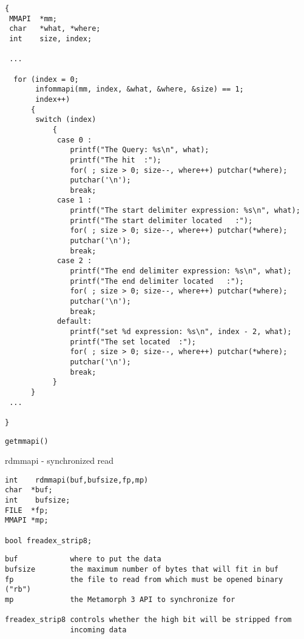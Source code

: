 \EXAMPLE
\begin{verbatim}
{
 MMAPI  *mm;
 char   *what, *where;
 int    size, index;

 ...

  for (index = 0;
       infommapi(mm, index, &what, &where, &size) == 1;
       index++)
      {
       switch (index)
           {
            case 0 :
               printf("The Query: %s\n", what);
               printf("The hit  :");
               for( ; size > 0; size--, where++) putchar(*where);
               putchar('\n');
               break;
            case 1 :
               printf("The start delimiter expression: %s\n", what);
               printf("The start delimiter located   :");
               for( ; size > 0; size--, where++) putchar(*where);
               putchar('\n');
               break;
            case 2 :
               printf("The end delimiter expression: %s\n", what);
               printf("The end delimiter located   :");
               for( ; size > 0; size--, where++) putchar(*where);
               putchar('\n');
               break;
            default:
               printf("set %d expression: %s\n", index - 2, what);
               printf("The set located  :");
               for( ; size > 0; size--, where++) putchar(*where);
               putchar('\n');
               break;
           }
      }
 ...

}

\end{verbatim}

\SEE
\begin{verbatim}
getmmapi()
\end{verbatim}

\NAME
{rdmmapi - synchronized read}

\SYNOPSIS
\begin{verbatim}
int    rdmmapi(buf,bufsize,fp,mp)
char  *buf;
int    bufsize;
FILE  *fp;
MMAPI *mp;

bool freadex_strip8;

\end{verbatim}

\DESCRIPTION
\begin{verbatim}
buf            where to put the data
bufsize        the maximum number of bytes that will fit in buf
fp             the file to read from which must be opened binary ("rb")
mp             the Metamorph 3 API to synchronize for

freadex_strip8 controls whether the high bit will be stripped from
               incoming data
\end{verbatim}


